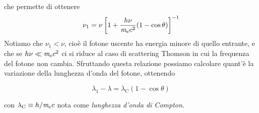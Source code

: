 che permette di ottenere
\begin{equation}
\nu_1 = \nu \left[ 1+\dfrac{h\nu}{\textit{m}_{e} c^2}(1-\cos\theta) \right]^{-1} \label{eq:Compton1}
\end{equation}
Notiamo che $\nu_1<\nu$, cioè il fotone uscente ha energia minore di quello entrante, e che se $h\nu \ll \textit{m}_{e} c^2$ ci si riduce al caso di scattering Thomson in cui la frequenza del fotone non cambia. Sfruttando questa relazione possiamo calcolare quant'è la variazione della lunghezza d'onda del fotone, ottenendo 
\begin{EQ}
\begin{equation}
\lambda_1 - \lambda = \lambda_\mathrm{C}(1-\cos\theta)
\end{equation}
\end{EQ}
con $\lambda_\mathrm{C}\equiv h/\textit{m}_{e} c$ nota come \textit{lunghezza d'onda di Compton}. 

